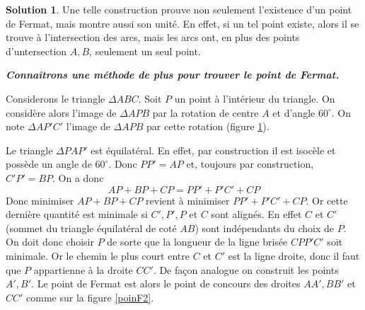 \documentclass[10pt,a4paper]{article}%
\theoremstyle{theorem}
\theoremstyle{definition}
\newtheorem*{solution*}{Solution}
\begin{document}
\begin{solution*}
			Une telle construction prouve non seulement l'existence d'un point de Fermat, mais montre aussi son unité. En effet, si un tel point existe, alors il se trouve à l'intersection des arcs, mais les arcs ont, en plus des points d'untersection $A,B$, seulement un seul point.
			
			
			\textbf{\textit{Connaîtrons une méthode de plus pour trouver le point de Fermat.}}
			
			Considerons le triangle $\Delta ABC$. Soit $P$ un point à l'intérieur du triangle. On considère alors l'image de $\Delta APB$ par la rotation de centre $A$ et d'angle $60^\circ$. On note $\Delta AP'C'$ l'image de $\Delta APB$ par cette rotation (figure \ref{pointF}).	
		
		 
			\begin{figure}[h]
				\begin{center}
		 		\caption{}\label{pointF}
				\end{center}
			\end{figure}
		
		
		 	Le triangle $\Delta PAP'$ est équilatéral. En effet, par construction il est isocèle et possède un angle de $60^\circ$. Donc $PP'=AP$ et, toujours par construction, $C'P'=BP$. On a donc
		 	\[AP+BP+CP=PP'+P'C'+CP\]
			Donc minimiser $AP+BP+CP$ revient à minimiser $PP'+P'C'+CP$. Or cette dernière quantité est minimale si $C',P',P$ et $C$ sont alignés. En effet $C$ et $C'$ (sommet du triangle équilatéral de coté $AB$) sont indépendants du choix de $P$. On doit donc choisir $P$ de sorte que la longueur de la ligne brisée $CPP'C'$ soit minimale. Or le chemin le plus court entre $C$ et $C'$ est la ligne droite, donc il faut que $P$ appartienne à la droite $CC'$. De façon analogue on construit les points $A',B'$. Le point de Fermat est alors le point de concours des droites $AA', BB'$ et $CC'$ comme sur la figure \ref{poinF2}.


\end{solution*}
\end{document}
